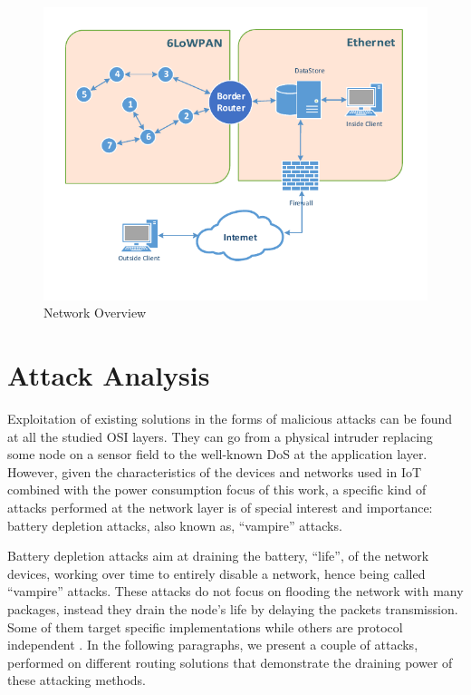 \documentclass{sig-alternate-05-2015}
\begin{document}
\begin{figure}[h]
  \centering
  \includegraphics[width=1.0\linewidth]{figures/Network_Overview.pdf}
  \caption{Network Overview}
  \label{fig:net_overview}
\end{figure}

\section{Attack Analysis}
\label{sec:attack_analysis}
Exploitation of existing solutions in the forms of malicious attacks can be found at all the studied OSI layers. They can go from a physical intruder replacing some node on a sensor field to the well-known \gls{DoS} at the application layer. However, given the characteristics of the devices and networks used in \gls{IoT} combined with the power consumption focus of this work, a specific kind of attacks performed at the network layer is of special interest and importance: battery depletion attacks, also known as, ``vampire'' attacks.

Battery depletion attacks aim at draining the battery, ``life'', of the network devices, working over time to entirely disable a network, hence being called ``vampire'' attacks. These attacks do not focus on flooding the network with many packages, instead they drain the node's life by delaying the packets transmission. Some of them target specific implementations while others are protocol independent \cite{Vasserman2013}\cite{Pongle2015}. In the following paragraphs, we present a couple of attacks, performed on different routing solutions that demonstrate the draining power of these attacking methods.
\end{document}
